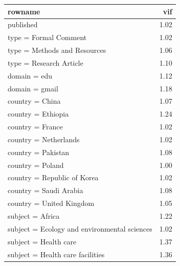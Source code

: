 \begin{table}[ht]
\centering
\begin{tabular}{lr}
 rowname & vif \\ 
  \hline
published & 1.02 \\ 
  type = Formal Comment & 1.02 \\ 
  type = Methods and Resources & 1.06 \\ 
  type = Research Article & 1.10 \\ 
  domain = edu & 1.12 \\ 
  domain = gmail & 1.18 \\ 
  country = China & 1.07 \\ 
  country = Ethiopia & 1.24 \\ 
  country = France & 1.02 \\ 
  country = Netherlands & 1.02 \\ 
  country = Pakistan & 1.08 \\ 
  country = Poland & 1.00 \\ 
  country = Republic of Korea & 1.02 \\ 
  country = Saudi Arabia & 1.08 \\ 
  country = United Kingdom & 1.05 \\ 
  subject = Africa & 1.22 \\ 
  subject = Ecology and environmental sciences & 1.02 \\ 
  subject = Health care & 1.37 \\ 
  subject = Health care facilities & 1.36 \\ 
  \end{tabular}
\end{table}

